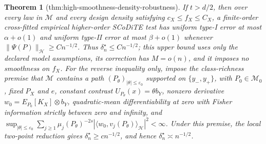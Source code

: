 \documentclass{article}
\newtheorem{theorem}{Theorem}
\begin{document}
\begin{theorem}[thm:high-smoothness-density-robustness]\label{thm:high-smoothness-density-robustness}
If \(t>d/2\), then over every law in \(\mathcal M\) and every design density satisfying \(c_X\le f_X\le C_X\), a finite-order cross-fitted empirical higher-order SCoDiTE test has uniform type-I error at most \(\alpha+o(1)\) and uniform type-II error at most \(\beta+o(1)\) whenever \(\|\Psi(P)\|_{\mathcal H}\ge Cn^{-1/2}\). Thus \(\delta_n^\star\le Cn^{-1/2}\); this upper bound uses only the declared model assumptions, its correction has \(M=o(n)\), and it imposes no smoothness on \(f_X\). For the reverse inequality only, impose the class-richness premise that \(\mathcal M\) contains a path \((P_\theta)_{|\theta|\le\varepsilon_0}\) supported on \(\{y_-,y_+\}\), with \(P_0\in\mathcal M_0\), fixed \(P_X\) and \(e\), constant contrast \(U_{P_\theta}(x)=\theta b_Y\), nonzero derivative \(w_0=E_{P_0}[K_X]\otimes b_Y\), quadratic-mean differentiability at zero with Fisher information strictly between zero and infinity, and \(\sup_{|\theta|\le\varepsilon_0}\sum_{j\ge1}\mu_j(P_\theta)^{-2s}|\langle w_0,v_j(P_\theta)\rangle_{\mathcal H}|^2<\infty\). Under this premise, the local two-point reduction gives \(\delta_n^\star\ge cn^{-1/2}\), and hence \(\delta_n^\star\asymp n^{-1/2}\).
\end{theorem}
\end{document}
